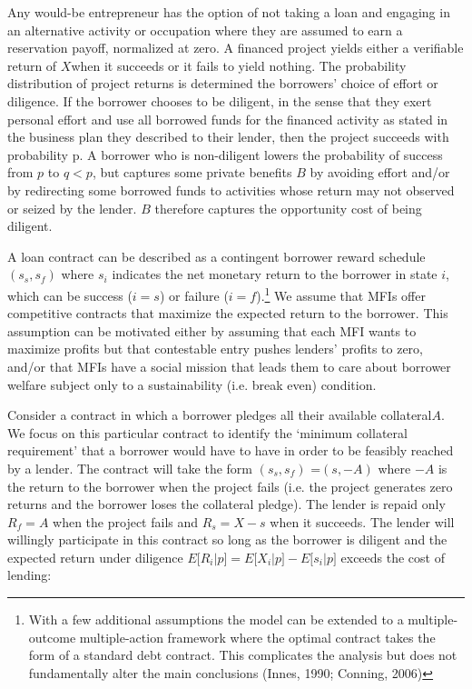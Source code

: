 \documentclass[
]{article}
\begin{document}
Any would-be entrepreneur has the option of not taking a loan and
engaging in an alternative activity or occupation where they are assumed
to earn a reservation payoff, normalized at zero. A financed project
yields either a verifiable return of \(X\)when it succeeds or it fails
to yield nothing. The probability distribution of project returns is
determined the borrowers' choice of effort or diligence. If the borrower
chooses to be diligent, in the sense that they exert personal effort and
use all borrowed funds for the financed activity as stated in the
business plan they described to their lender, then the project succeeds
with probability \(\text{p.}\) A borrower who is non-diligent lowers the
probability of success from \(p\) to \(q < p\), but captures some
private benefits \(B\) by avoiding effort and/or by redirecting some
borrowed funds to activities whose return may not observed or seized by
the lender. \(B\) therefore captures the opportunity cost of being
diligent.

A loan contract can be described as a contingent borrower reward
schedule \((s_{s},s_{f})\) where \(s_{i}\) indicates the net monetary
return to the borrower in state \(i\), which can be success (\(i = s\))
or failure (\(i = f\)).\footnote{With a few additional assumptions the
  model can be extended to a multiple-outcome multiple-action framework
  where the optimal contract takes the form of a standard debt contract.
  This complicates the analysis but does not fundamentally alter the
  main conclusions (Innes, 1990; Conning, 2006)} We assume that MFIs
offer competitive contracts that maximize the expected return to the
borrower. This assumption can be motivated either by assuming that each
MFI wants to maximize profits but that contestable entry pushes lenders'
profits to zero, and/or that MFIs have a social mission that leads them
to care about borrower welfare subject only to a sustainability (i.e.
break even) condition.

Consider a contract in which a borrower pledges all their available
collateral\(A\). We focus on this particular contract to identify the
`minimum collateral requirement' that a borrower would have to have in
order to be feasibly reached by a lender. The contract will take the
form \((s_{s},s_{f})\) =\((s, - A)\) where \(- A\) is the return to the
borrower when the project fails (i.e. the project generates zero returns
and the borrower loses the collateral pledge). The lender is repaid only
\(R_{f} = A\) when the project fails and \(R_{s} = X - s\) when it
succeeds. The lender will willingly participate in this contract so long
as the borrower is diligent and the expected return under diligence
\(E\lbrack R_{i}|p\rbrack = E\lbrack X_{i}|p\rbrack - E\lbrack s_{i}|p\rbrack\)
exceeds the cost of lending:
\end{document}
